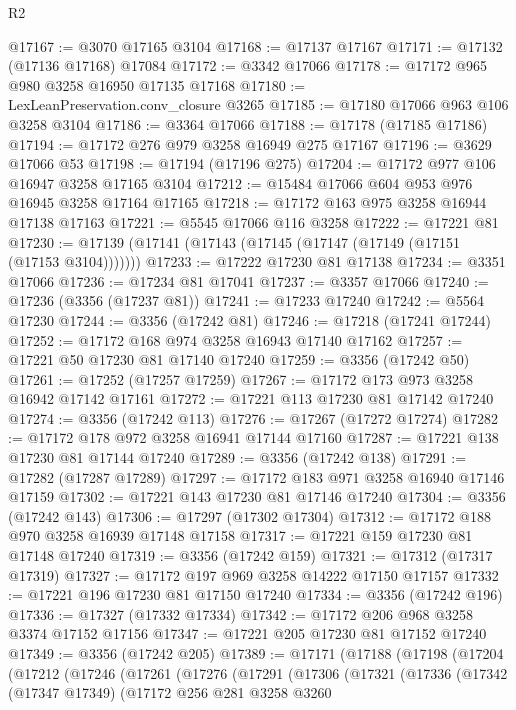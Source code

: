 \begin{lexlean}{R2}
\begin{coremodule}
@17167 := @3070 @17165 @3104
@17168 := @17137 @17167
@17171 := @17132 (@17136 @17168) @17084
@17172 := @3342 @17066
@17178 := @17172 @965 @980 @3258 @16950 @17135 @17168
@17180 := LexLeanPreservation.conv_closure @3265
@17185 := @17180 @17066 @963 @106 @3258 @3104
@17186 := @3364 @17066
@17188 := @17178 (@17185 @17186)
@17194 := @17172 @276 @979 @3258 @16949 @275 @17167
@17196 := @3629 @17066 @53
@17198 := @17194 (@17196 @275)
@17204 := @17172 @977 @106 @16947 @3258 @17165 @3104
@17212 := @15484 @17066 @604 @953 @976 @16945 @3258 @17164 @17165
@17218 := @17172 @163 @975 @3258 @16944 @17138 @17163
@17221 := @5545 @17066 @116 @3258
@17222 := @17221 @81
@17230 := @17139 (@17141 (@17143 (@17145 (@17147 (@17149 (@17151 (@17153 @3104)))))))
@17233 := @17222 @17230 @81 @17138
@17234 := @3351 @17066
@17236 := @17234 @81 @17041
@17237 := @3357 @17066
@17240 := @17236 (@3356 (@17237 @81))
@17241 := @17233 @17240
@17242 := @5564 @17230
@17244 := @3356 (@17242 @81)
@17246 := @17218 (@17241 @17244)
@17252 := @17172 @168 @974 @3258 @16943 @17140 @17162
@17257 := @17221 @50 @17230 @81 @17140 @17240
@17259 := @3356 (@17242 @50)
@17261 := @17252 (@17257 @17259)
@17267 := @17172 @173 @973 @3258 @16942 @17142 @17161
@17272 := @17221 @113 @17230 @81 @17142 @17240
@17274 := @3356 (@17242 @113)
@17276 := @17267 (@17272 @17274)
@17282 := @17172 @178 @972 @3258 @16941 @17144 @17160
@17287 := @17221 @138 @17230 @81 @17144 @17240
@17289 := @3356 (@17242 @138)
@17291 := @17282 (@17287 @17289)
@17297 := @17172 @183 @971 @3258 @16940 @17146 @17159
@17302 := @17221 @143 @17230 @81 @17146 @17240
@17304 := @3356 (@17242 @143)
@17306 := @17297 (@17302 @17304)
@17312 := @17172 @188 @970 @3258 @16939 @17148 @17158
@17317 := @17221 @159 @17230 @81 @17148 @17240
@17319 := @3356 (@17242 @159)
@17321 := @17312 (@17317 @17319)
@17327 := @17172 @197 @969 @3258 @14222 @17150 @17157
@17332 := @17221 @196 @17230 @81 @17150 @17240
@17334 := @3356 (@17242 @196)
@17336 := @17327 (@17332 @17334)
@17342 := @17172 @206 @968 @3258 @3374 @17152 @17156
@17347 := @17221 @205 @17230 @81 @17152 @17240
@17349 := @3356 (@17242 @205)
@17389 := @17171
    (@17188
      (@17198
        (@17204
          (@17212
            (@17246
              (@17261
                (@17276
                  (@17291
                    (@17306
                      (@17321
                        (@17336
                          (@17342
                            (@17347 @17349)
                            (@17172
                              @256
                              @281
                              @3258
                              @3260

\end{coremodule}
\end{lexlean}
